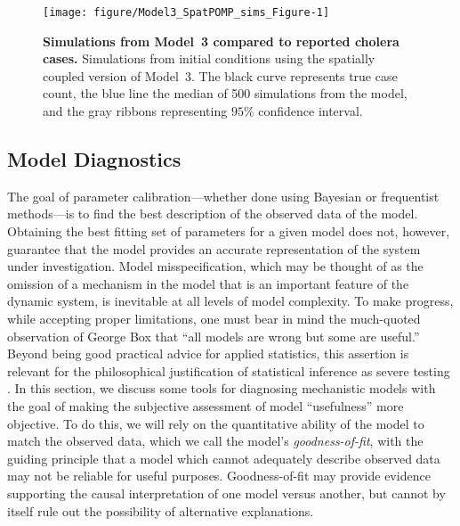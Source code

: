 \documentclass[10pt,letterpaper]{article}\usepackage[]{graphicx}\usepackage[table]{xcolor}
\makeatletter
\def\maxwidth{ %
  \ifdim\Gin@nat@width>\linewidth
    \linewidth
  \else
    \Gin@nat@width
  \fi
}
\newenvironment{knitrout}{}{} %
\newcommand\figTitle{\bf}
\makeatother
\begin{document}
\begin{figure}[!h]
\begin{knitrout}
\color{fgcolor}
\texttt{[image: figure/Model3\_SpatPOMP\_sims\_Figure-1]} 
\end{knitrout}
\caption{\label{fig:h3spatsims}
{\figTitle Simulations from Model~3 compared to reported cholera cases.}
Simulations from initial conditions using the spatially coupled version of Model~3.
The black curve represents true case count, the blue line the median of 500 simulations from the model, and the gray ribbons representing $95\%$ confidence interval.
}
\end{figure}



\subsection*{Model Diagnostics}\label{sec:model_diagnostics}

The goal of parameter calibration---whether done using Bayesian or frequentist methods---is to find the best description of the observed data   of the model.
Obtaining the best fitting set of parameters for a given model does not, however, guarantee that the model provides an accurate representation of the system under investigation.
Model misspecification, which may be thought of as the omission of a mechanism in the model that is an important feature of the dynamic system, is inevitable at all levels of model complexity.
To make progress, while accepting proper limitations, one must bear in mind the much-quoted observation of George Box \cite{box79} that ``all models are wrong but some are useful.''
Beyond being good practical advice for applied statistics, this assertion is relevant for the philosophical justification of statistical inference as severe testing \cite{mayo18}. %
In this section, we discuss some tools for diagnosing mechanistic models with the goal of making the subjective assessment of model ``usefulness'' more objective.
To do this, we will rely on the quantitative ability of the model to match the observed data, which we call the model's {\it goodness-of-fit}, with the guiding principle that a model which cannot adequately describe observed data may not be reliable for useful purposes.
Goodness-of-fit may provide evidence supporting the causal interpretation of one model versus another, but cannot by itself rule out the possibility of alternative explanations.
\end{document}
